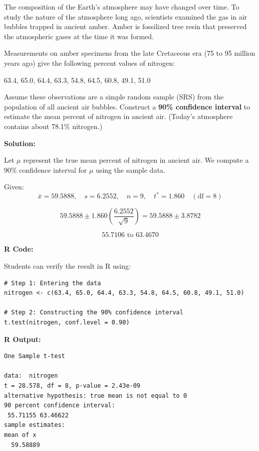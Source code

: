 \begin{example}

The composition of the Earth's atmosphere may have changed over time. To study the nature of the atmosphere long ago, scientists examined the gas in air bubbles trapped in ancient amber. Amber is fossilized tree resin that preserved the atmospheric gases at the time it was formed.

Measurements on amber specimens from the late Cretaceous era (75 to 95 million years ago) give the following percent values of nitrogen:

\begin{center}
63.4, 65.0, 64.4, 63.3, 54.8, 64.5, 60.8, 49.1, 51.0
\end{center}

Assume these observations are a simple random sample (SRS) from the population of all ancient air bubbles. Construct a \textbf{90\% confidence interval} to estimate the mean percent of nitrogen in ancient air. (Today’s atmosphere contains about 78.1\% nitrogen.)

\vspace{1em}
\textbf{Solution:}

Let \(\mu\) represent the true mean percent of nitrogen in ancient air. We compute a 90\% confidence interval for \(\mu\) using the sample data.

Given: 
\[
\bar{x} = 59.5888, \quad s = 6.2552, \quad n = 9, \quad t^* = 1.860 \quad (\text{df} = 8)
\]

\[
59.5888 \pm 1.860 \left( \frac{6.2552}{\sqrt{9}} \right) = 59.5888 \pm 3.8782
\]

\[
\boxed{55.7106 \text{ to } 63.4670}
\]

\vspace{1em}
\textbf{R Code:}

Students can verify the result in R using:

\begin{verbatim}
# Step 1: Entering the data
nitrogen <- c(63.4, 65.0, 64.4, 63.3, 54.8, 64.5, 60.8, 49.1, 51.0)

# Step 2: Constructing the 90% confidence interval
t.test(nitrogen, conf.level = 0.90)
\end{verbatim}

\vspace{1em}
\textbf{R Output:}

\begin{verbatim}
One Sample t-test

data:  nitrogen
t = 28.578, df = 8, p-value = 2.43e-09
alternative hypothesis: true mean is not equal to 0
90 percent confidence interval:
 55.71155 63.46622
sample estimates:
mean of x 
  59.58889 
\end{verbatim}

\end{example}
